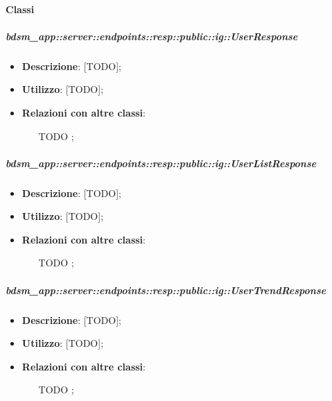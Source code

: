 	\paragraph{Classi} %

    \subparagraph{bdsm\_app::server::endpoints::resp::public::ig::UserResponse} %
    \label{subp:bdsm_app_server_endpoints_resp_public_ig_userresponse}
    \begin{itemize}
      \item \textbf{Descrizione}: [TODO];
      \item \textbf{Utilizzo}: [TODO];
      \item \textbf{Relazioni con altre classi}:
        \begin{itemize}
          \item [TODO];
        \end{itemize}
      \end{itemize}
    
    \subparagraph{bdsm\_app::server::endpoints::resp::public::ig::UserListResponse} %
    \label{subp:bdsm_app_server_endpoints_resp_public_ig_userlistresponse}
    \begin{itemize}
      \item \textbf{Descrizione}: [TODO];
      \item \textbf{Utilizzo}: [TODO];
      \item \textbf{Relazioni con altre classi}:
        \begin{itemize}
          \item [TODO];
        \end{itemize}
      \end{itemize}
    
    \subparagraph{bdsm\_app::server::endpoints::resp::public::ig::UserTrendResponse} %
    \label{subp:bdsm_app_server_endpoints_resp_public_ig_usertrendresponse}
    \begin{itemize}
      \item \textbf{Descrizione}: [TODO];
      \item \textbf{Utilizzo}: [TODO];
      \item \textbf{Relazioni con altre classi}:
        \begin{itemize}
          \item [TODO];
        \end{itemize}
      \end{itemize}
    
